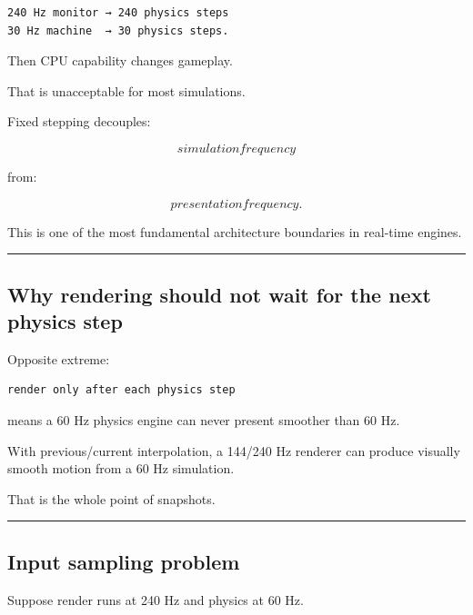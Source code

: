 \begin{verbatim}
240 Hz monitor → 240 physics steps
30 Hz machine  → 30 physics steps.
\end{verbatim}

Then CPU capability changes gameplay.

That is unacceptable for most simulations.

Fixed stepping decouples:

\[
\boxed{
simulation frequency
}
\]

from:

\[
\boxed{
presentation frequency.
}
\]

This is one of the most fundamental architecture boundaries in real-time engines.

\begin{center}\rule{0.5\linewidth}{0.5pt}\end{center}

\subsection{Why rendering should not wait for the next physics step}\label{06-engine-ii-ch038-why-rendering-should-not-wait-for-the-next-physics-step}

\hypertarget{06-engine-ii-ch038-why-rendering-should-not-wait-for-the-next-physics-step}{}

Opposite extreme:

\begin{verbatim}
render only after each physics step
\end{verbatim}

means a 60 Hz physics engine can never present smoother than 60 Hz.

With previous/current interpolation, a 144/240 Hz renderer can produce visually smooth motion from a 60 Hz simulation.

That is the whole point of snapshots.

\begin{center}\rule{0.5\linewidth}{0.5pt}\end{center}

\subsection{Input sampling problem}\label{06-engine-ii-ch038-input-sampling-problem}

\hypertarget{06-engine-ii-ch038-input-sampling-problem}{}

Suppose render runs at 240 Hz and physics at 60 Hz.

